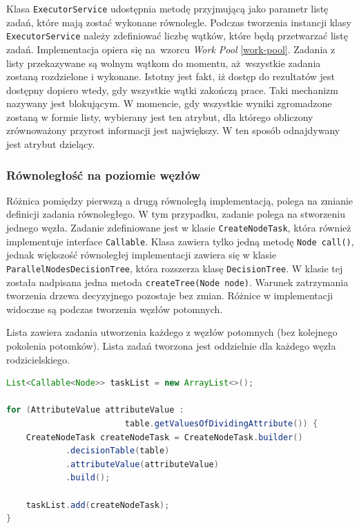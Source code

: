 \documentclass[12pt]{article}
\begin{document}
Klasa \verb|ExecutorService| udostępnia metodę przyjmującą jako parametr listę zadań, które mają zostać wykonane równolegle. Podczas tworzenia instancji
klasy \verb|ExecutorService| należy zdefiniować liczbę wątków, które będą przetwarzać listę zadań. Implementacja opiera się na~wzorcu \textit{Work Pool} \ref{work-pool}.
Zadania z listy przekazywane są wolnym wątkom do momentu, aż~wszystkie zadania zostaną rozdzielone i wykonane. Istotny jest fakt, iż dostęp do rezultatów
jest dostępny dopiero wtedy, gdy wszystkie wątki zakończą prace. Taki mechanizm nazywany jest blokującym. W momencie, gdy wszystkie wyniki zgromadzone
zostaną w formie listy, wybierany jest ten atrybut, dla którego obliczony zrównoważony przyrost informacji jest największy. W ten sposób odnajdywany jest atrybut dzielący.

\subsubsection{Równoległość na poziomie węzłów}

Różnica pomiędzy pierwszą a drugą równoległą implementacją, polega na zmianie definicji zadania równoległego. W tym przypadku, zadanie polega na stworzeniu jednego
węzła. Zadanie zdefiniowane jest w klasie \verb|CreateNodeTask|, która również implementuje interface \verb|Callable|. Klasa zawiera tylko jedną metodę
\verb|Node call()|, jednak większość równoległej implementacji zawiera się w klasie \verb|ParallelNodesDecisionTree|, która rozszerza klasę \verb|DecisionTree|.
W klasie tej została nadpisana jedna metoda \verb|createTree(Node node)|. Warunek zatrzymania tworzenia drzewa decyzyjnego pozostaje bez zmian. Różnice w
implementacji widoczne są podczas tworzenia węzłów potomnych.

Lista zawiera zadania utworzenia każdego z węzłów potomnych (bez kolejnego pokolenia potomków). Lista zadań tworzona jest oddzielnie
dla każdego węzła rodzicielskiego.

\begin{lstlisting}[language=java, caption=Lista zadań równoległego tworzenia węzłów,frame=single,label={lst:create-node-parallel}]
List<Callable<Node>> taskList = new ArrayList<>();

for (AttributeValue attributeValue :
                        table.getValuesOfDividingAttribute()) {
    CreateNodeTask createNodeTask = CreateNodeTask.builder()
            .decisionTable(table)
            .attributeValue(attributeValue)
            .build();

    taskList.add(createNodeTask);
}
\end{lstlisting}
\end{document}

